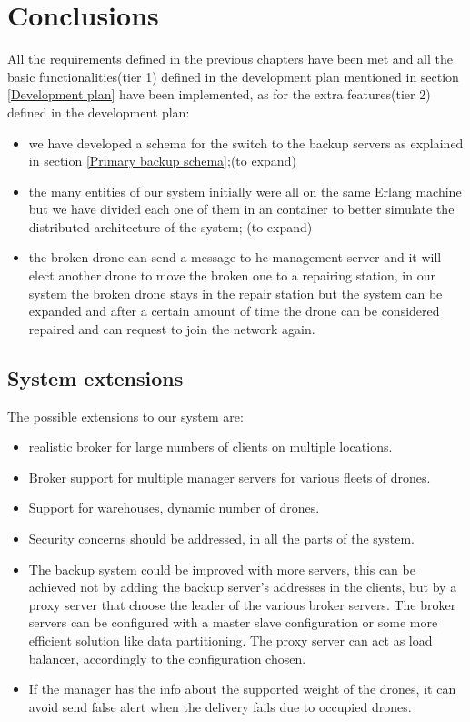 \documentclass[a4paper, oneside]{memoir}
\begin{document}
\chapter{Conclusions}
All the requirements defined in the previous chapters have been met and all the basic functionalities(tier 1) defined in the development plan mentioned in section \ref{Development plan} have been implemented, as for the extra features(tier 2) defined in the development plan:
\begin{itemize}
\item we have developed a schema for the switch to the backup servers as explained in section \ref{Primary backup schema};(to expand)
\item the many entities of our system initially were all on the same Erlang machine but we have divided each one of them in an container to better simulate the distributed architecture of the system; (to expand)
\item the broken drone can send a message to he management server and it will elect another drone to move the broken one to a repairing station, in our system the broken drone stays in the repair station but the system can be expanded and after a certain amount of time the drone can be considered repaired and can request to join the network again.
\end{itemize}

\section{System extensions}
The possible extensions to our system are:
\begin{itemize}
	\item realistic broker for large numbers of clients on multiple locations.
	\item Broker support for multiple manager servers for various fleets of drones.
	\item Support for warehouses, dynamic number of drones.
	\item Security concerns should be addressed, in all the parts of the system.
	\item The backup system could be improved with more servers, this can be achieved not by adding the backup server's addresses in the clients, but by a proxy server that choose the leader of the various broker servers. The broker servers can be configured with a master slave configuration or some more efficient solution like data partitioning. The proxy server can act as load balancer, accordingly to the configuration chosen.
	\item If the manager has the info about the supported weight of the drones, it can avoid send false alert when the delivery fails due to occupied drones.
\end{itemize}
\end{document}
